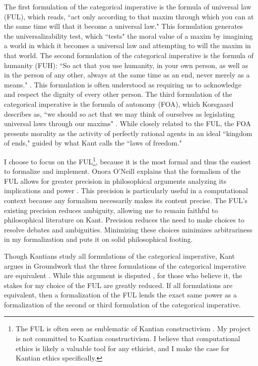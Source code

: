 \begin{isabellebody}
\begin{isamarkuptext}
The first formulation of the categorical imperative is the
formula of universal law (FUL), which reads, ``act only according to that maxim through which you can 
at the same time will that it become a universal law." \cite[34]{groundwork} This formulation
generates the universalizability test, which ``tests" the moral value of a maxim by 
imagining a world in which it becomes a universal law and attempting to will the maxim in that world. The 
second formulation of the categorical imperative is the formula of humanity (FUH): ``So act that you use humanity, 
in your own person, as well as in the person of any other, always at the same time as an end, never merely 
as a means." \cite[41]{groundwork}. This formulation is often understood as requiring us to 
acknowledge and respect the dignity of every other person. The third formulation of the categorical 
imperative is the formula of autonomy (FOA), which Korsgaard describes
as, ``we should so act that we may think of ourselves as legislating universal laws through our 
maxims" \cite[28]{korsgaardintro}. While closely related to the FUL, the FOA presents morality as the activity of 
perfectly rational agents in an ideal ``kingdom of ends," guided by what Kant calls the ``laws of freedom."

I choose to focus on the FUL\footnote{The FUL is often seen as emblematic of Kantian constructivism \cite[173]{ebelsduggan}. 
My project is not committed to Kantian constructivism. I believe that computational ethics is likely a 
valuable tool for any ethicist, and I make the case for Kantian ethics specifically.},
 because it is the most formal and thus the easiest to formalize and implement. 
Onora O'Neill explains that the formalism of the FUL allows 
for greater precision in philosophical arguments analyzing its implications and power \cite[33]{actingonprinciple}. This precision 
is particularly useful in a computational context because any formalism necessarily makes its content 
precise. The FUL's existing precision reduces ambiguity, allowing me to remain faithful to philosophical
literature on Kant. Precision reduces the need to make choices to resolve debates 
and ambiguities. Minimizing these choices minimizes 
arbitrariness in my formalization and puts it on solid philosophical footing.

Though Kantians study all formulations of the categorical imperative, Kant argues in Groundwork 
that the three formulations of the categorical imperative are equivalent \cite{groundwork}. While this 
argument is disputed \cite{sepkant}, for those who believe it, the
stakes for my choice of the FUL are greatly reduced. If all formulations are equivalent, then a formalization of the FUL
lends the exact same power as a formalization of the second or third formulation of the categorical 
imperative. 


\end{isamarkuptext}
\end{isabellebody}
